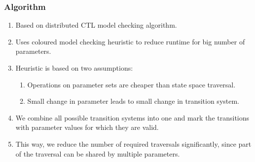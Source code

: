 \documentclass{beamer}
\begin{document}
  \begin{frame}
  	\frametitle{Algorithm}
  	\begin{enumerate}
  		\item Based on distributed CTL model checking algorithm.
  		\item Uses coloured model checking heuristic to reduce runtime for big number of parameters.
  		\item Heuristic is based on two assumptions:
  		\begin{enumerate}
	  		\item Operations on parameter sets are cheaper than state space traversal.
  			\item Small change in parameter leads to small change in transition system.  		
  		\end{enumerate}
  		\item We combine all possible transition systems into one and mark the transitions with parameter values for which they are valid.
  		\item This way, we reduce the number of required traversals significantly, since part of the traversal can be shared by multiple parameters. 	
  	\end{enumerate}
  \end{frame}
\end{document}

